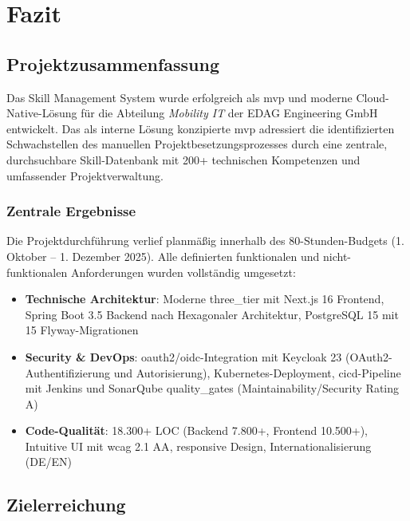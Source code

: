 \chapter{Fazit}

\section{Projektzusammenfassung}

Das Skill Management System wurde erfolgreich als \gls{mvp} und moderne Cloud-Native-Lösung für die Abteilung \textit{Mobility IT} der EDAG Engineering GmbH entwickelt. Das als interne Lösung konzipierte \gls{mvp} adressiert die identifizierten Schwachstellen des manuellen Projektbesetzungsprozesses durch eine zentrale, durchsuchbare Skill-Datenbank mit 200+ technischen Kompetenzen und umfassender Projektverwaltung.

\subsection{Zentrale Ergebnisse}

Die Projektdurchführung verlief planmäßig innerhalb des 80-Stunden-Budgets (1. Oktober -- 1. Dezember 2025). Alle definierten funktionalen und nicht-funktionalen Anforderungen wurden vollständig umgesetzt:

\begin{itemize}[noitemsep]
    \item \textbf{Technische Architektur}: Moderne \gls{three_tier} mit Next.js 16\cite{nextjs_docs} Frontend, Spring Boot 3.5\cite{spring_boot_docs} Backend nach Hexagonaler Architektur, PostgreSQL 15\cite{postgresql_docs} mit 15 Flyway-Migrationen\cite{flyway_docs}
\item \textbf{Security \& DevOps}: \gls{oauth}2/\gls{oidc}-Integration mit Keycloak 23\cite{keycloak_docs} (OAuth2-Authentifizierung und Autorisierung), Kubernetes-Deployment\cite{kubernetes_docs}, \gls{cicd}-Pipeline mit Jenkins\cite{jenkins_docs} und SonarQube\cite{sonarqube_docs} \glspl{quality_gate} (Maintainability/Security Rating A)
    \item \textbf{Code-Qualität}: 18.300+ LOC (Backend 7.800+, Frontend 10.500+), Intuitive UI mit \gls{wcag} 2.1 AA\cite{wcag}, responsive Design, Internationalisierung (DE/EN)
\end{itemize}

\section{Zielerreichung}

